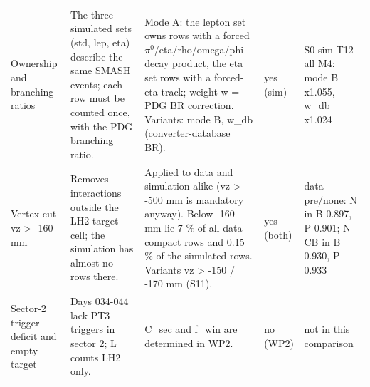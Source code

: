 {\begin{longtable}{>{\raggedright\arraybackslash}p{2.1cm}>{\raggedright\arraybackslash}p{3.7cm}>{\raggedright\arraybackslash}p{5.25cm}>{\raggedright\arraybackslash}p{1.15cm}>{\raggedright\arraybackslash}p{3.3cm}}
Ownership and branching ratios & The three simulated sets (std, lep, eta) describe the same SMASH events; each row must be counted once, with the PDG branching ratio. & Mode A: the lepton set owns rows with a forced $\pi^0$/eta/rho/omega/phi decay product, the eta set rows with a forced-eta track; weight w = PDG BR correction. Variants: mode B, w\_db (converter-database BR). & yes (sim) & S0 sim T12 all M4: mode B x1.055, w\_db x1.024 \\
Vertex cut vz > -160 mm & Removes interactions outside the LH2 target cell; the simulation has almost no rows there. & Applied to data and simulation alike (vz > -500 mm is mandatory anyway). Below -160 mm lie 7 \% of all data compact rows and 0.15 \% of the simulated rows. Variants vz > -150 / -170 mm (S11). & yes (both) & data pre/none: N in B 0.897, P 0.901; N - CB in B 0.930, P 0.933 \\
Sector-2 trigger deficit and empty target & Days 034-044 lack PT3 triggers in sector 2; L counts LH2 only. & C\_sec and f\_win are determined in WP2. & no (WP2) & not in this comparison \\
\bottomrule
\end{longtable}}
